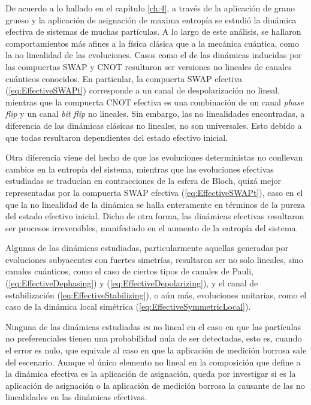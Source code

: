 De acuerdo a lo hallado en el capítulo \ref{ch:4}, a través de la aplicación de grano grueso y la aplicación de asignación de maxima entropía se estudió la dinámica efectiva de sistemas de muchas partículas. A lo largo de este análisis, se hallaron comportamientos más afines a la física clásica que a la mecánica cuántica, como la no linealidad de las evoluciones. Casos como el de las dinámicas inducidas por las compuertas SWAP y CNOT resultaron ser versiones no lineales de canales cuánticos conocidos. En particular, la compuerta SWAP efectiva (\ref{eq:EffectiveSWAPt}) corresponde a un canal de despolarización no lineal, mientras que la compuerta CNOT efectiva es una combinación de un canal \textit{phase flip} y un canal \textit{bit flip} no lineales. Sin embargo, las no linealidades encontradas, a diferencia de las dinámicas clásicas no lineales, no son universales. Esto debido a que todas resultaron dependientes del estado efectivo inicial. 
%

Otra diferencia viene del hecho de que las evoluciones deterministas \acnote{\checkmark} no conllevan cambios en la entropía del sistema, mientras que las evoluciones efectivas estudiadas se traducían en contracciones de la esfera de Bloch, quizá mejor representadas por la compuerta SWAP efectiva (\ref{eq:EffectiveSWAPt}), caso en el que la no linealidad de la dinámica se halla enteramente en términos de la pureza del estado efectivo inicial. Dicho de otra forma, las dinámicas efectivas resultaron ser procesos irreversibles, manifestado en el aumento de la entropía del sistema. \acnote{\checkmark}

Algunas de las dinámicas estudiadas, particularmente aquellas generadas por evoluciones subyacentes con fuertes simetrías, resultaron ser no solo lineales, sino canales cuánticos, como el caso de ciertos tipos de canales de Pauli, (\ref{eq:EffectiveDephasing}) y (\ref{eq:EffectiveDepolarizing}), y el canal de estabilización (\ref{eq:EffectiveStabilizing}), o aún más, evoluciones unitarias, como el caso de la dinámica local simétrica (\ref{eq:EffectiveSymmetricLocal}). 

Ninguna de las dinámicas estudiadas es no lineal en el caso en que las partículas no preferenciales tienen una probabilidad nula de ser detectadas, esto es, cuando el error es nulo, que equivale al caso en que la aplicación de medición borrosa sale del escenario. Aunque el único elemento no lineal en la composición que define a la dinámica efectiva es la aplicación de asignación, queda por investigar si es la aplicación de asignación o la aplicación de medición borrosa la causante de las no linealidades en las dinámicas efectivas.


